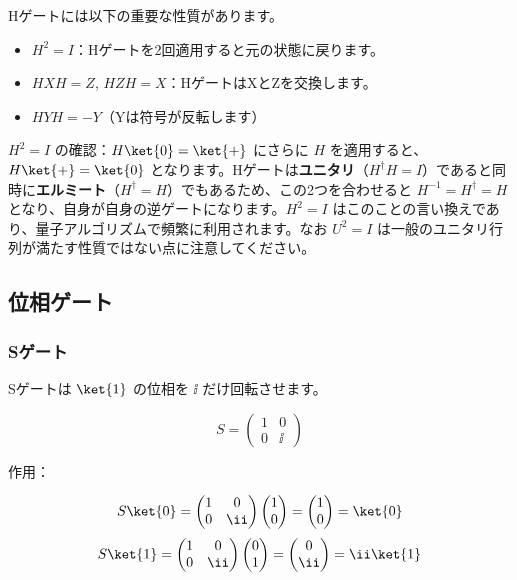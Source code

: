 Hゲートには以下の重要な性質があります。

\begin{itemize}
\item $H^2 = I$：Hゲートを2回適用すると元の状態に戻ります。
\item $H X H = Z$, $H Z H = X$：HゲートはXとZを交換します。
\item $H Y H = -Y$（Yは符号が反転します）
\end{itemize}

\begin{warningbox}
$H^2 = I$ の確認：$H\ket{0} = \ket{+}$ にさらに $H$ を適用すると、$H\ket{+} = \ket{0}$ となります。Hゲートは\textbf{ユニタリ}（$H^\dagger H = I$）であると同時に\textbf{エルミート}（$H^\dagger = H$）でもあるため、この2つを合わせると $H^{-1} = H^\dagger = H$ となり、自身が自身の逆ゲートになります。$H^2 = I$ はこのことの言い換えであり、量子アルゴリズムで頻繁に利用されます。なお $U^2 = I$ は一般のユニタリ行列が満たす性質ではない点に注意してください。
\end{warningbox}

\subsection{位相ゲート}

\subsubsection{Sゲート}

Sゲートは $\ket{1}$ の位相を $\ii$ だけ回転させます。

\[
S = \begin{pmatrix} 1 & 0 \\ 0 & \ii \end{pmatrix}
\]

作用：

\[
S \ket{0} = \begin{pmatrix} 1 & 0 \\ 0 & \ii \end{pmatrix} \begin{pmatrix} 1 \\ 0 \end{pmatrix} = \begin{pmatrix} 1 \\ 0 \end{pmatrix} = \ket{0}
\]
\[
S \ket{1} = \begin{pmatrix} 1 & 0 \\ 0 & \ii \end{pmatrix} \begin{pmatrix} 0 \\ 1 \end{pmatrix} = \begin{pmatrix} 0 \\ \ii \end{pmatrix} = \ii \ket{1}
\]

